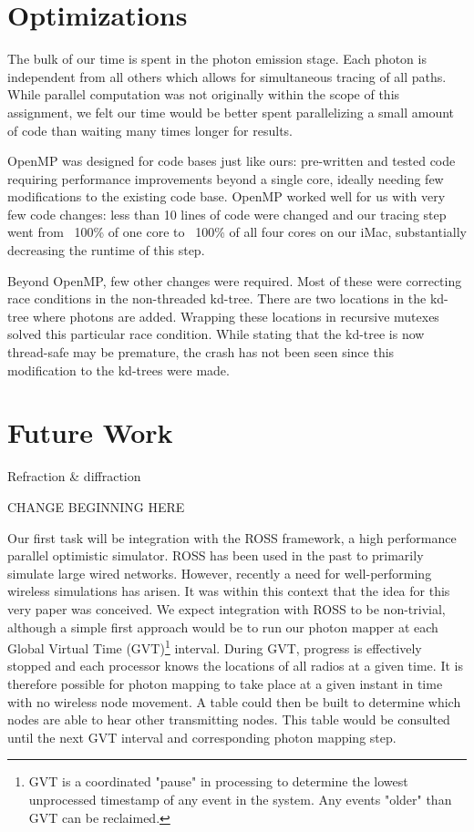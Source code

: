 \documentclass[%
        final,
        notitlepage,
        narroweqnarray,
        inline,
        twoside,
        ]{ieee}
\begin{document}
\section{Optimizations}
The bulk of our time is spent in the photon emission stage.  Each photon is
independent from all others which allows for simultaneous tracing of all
paths.  While parallel computation was not originally within the scope of this
assignment, we felt our time would be better spent parallelizing a small amount
of code than waiting many times longer for results.

OpenMP \cite{Grama} was designed for code bases just like ours: pre-written and
tested code requiring performance improvements beyond a single core, ideally
needing few modifications to the existing code base.  OpenMP worked well for
us with very few code changes: less than 10 lines of code were changed and
our tracing step went from ~100\% of one core to ~100\% of all four cores on
our iMac, substantially decreasing the runtime of this step.

Beyond OpenMP, few other changes were required.  Most of these were correcting
race conditions in the non-threaded kd-tree.  There are two locations in the
kd-tree where photons are added.  Wrapping these locations in recursive
mutexes solved this particular race condition.  While stating that the kd-tree
is now thread-safe may be premature, the crash has not been seen since this
modification to the kd-trees were made.

\section{Future Work}

Refraction \& diffraction

CHANGE BEGINNING HERE

Our first task will be integration with the ROSS \cite{ross} framework, a high
performance parallel optimistic simulator.  ROSS has been used in the past to
primarily simulate large wired networks.  However, recently a need for
well-performing wireless simulations has arisen.  It was within this context
that the idea for this very paper was conceived.  We expect integration with
ROSS to be non-trivial, although a simple first approach would be to run our
photon mapper at each Global Virtual Time (GVT)\footnote{GVT is a coordinated
"pause" in processing to determine the lowest unprocessed timestamp of any
event in the system.  Any events "older" than GVT can be reclaimed.} interval.
During GVT, progress is effectively stopped and each processor knows the
locations of all radios at a given time.  It is therefore possible for photon
mapping to take place at a given instant in time with no wireless node movement.
A table could then be built to determine which nodes are able to hear other
transmitting nodes.  This table would be consulted until the next GVT interval
and corresponding photon mapping step.
\end{document}
